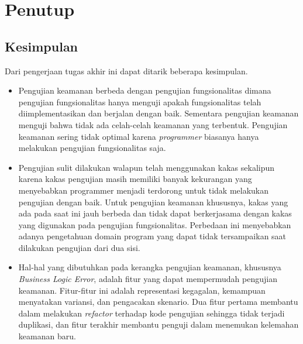 \chapter{Penutup}

\section{Kesimpulan}



Dari pengerjaan tugas akhir ini dapat ditarik beberapa kesimpulan.

\begin{itemize}
  \item Pengujian keamanan berbeda dengan pengujian fungsionalitas dimana pengujian fungsionalitas hanya menguji apakah fungsionalitas
        telah diimplementasikan dan berjalan dengan baik. Sementara pengujian keamanan menguji bahwa tidak ada celah-celah keamanan
        yang terbentuk. Pengujian keamanan sering tidak optimal karena \textit{programmer} biasanya hanya melakukan pengujian
        fungsionalitas saja.

  \item Pengujian sulit dilakukan walapun telah menggunakan kakas sekalipun karena kakas pengujian masih memiliki banyak kekurangan
        yang menyebabkan programmer menjadi terdorong untuk tidak melakukan pengujian dengan baik. Untuk pengujian
        keamanan khususnya, kakas yang ada pada saat ini jauh berbeda dan tidak dapat berkerjasama dengan kakas
        yang digunakan pada pengujian fungsionalitas. Perbedaan ini menyebabkan adanya pengetahuan domain program
        yang dapat tidak tersampaikan saat dilakukan pengujian dari dua sisi.

  \item Hal-hal yang dibutuhkan pada kerangka pengujian keamanan, khususnya \textit{Business Logic Error}, adalah fitur
        yang dapat mempermudah pengujian keamanan. Fitur-fitur ini adalah representasi kegagalan, kemampuan menyatakan variansi,
        dan pengacakan skenario. Dua fitur pertama membantu dalam melakukan \textit{refactor} terhadap kode pengujian sehingga
        tidak terjadi duplikasi, dan fitur terakhir membantu penguji dalam menemukan kelemahan keamanan baru.
\end{itemize}

